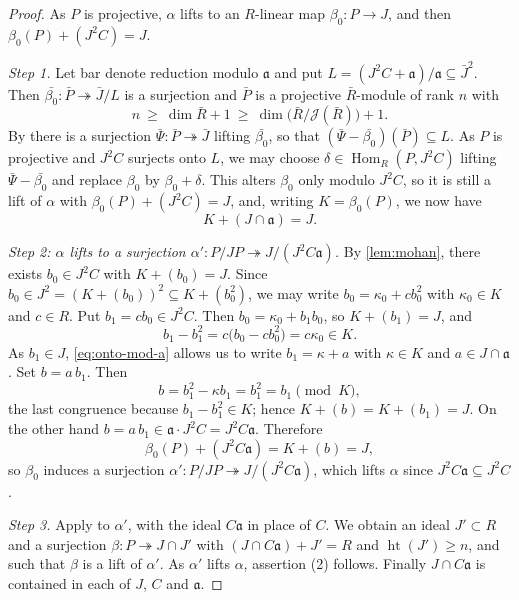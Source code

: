 \documentclass[11pt,reqno]{amsart}
\theoremstyle{plain}
\theoremstyle{definition}
\begin{document}
\begin{proof}
As $P$ is projective, $\alpha$ lifts to an $R$-linear map $\beta_{0}\colon P\to J$,
and then $\beta_{0}(P)+(J^{2}C)=J$.

\smallskip
\noindent\emph{Step 1.}
Let bar denote reduction modulo $\mathfrak{a}$ and put
$L=(J^{2}C+\mathfrak{a})/\mathfrak{a}\subseteq\bar{J}^{2}$. Then
$\bar{\beta_{0}}\colon\bar{P}\twoheadrightarrow\bar{J}/L$ is a surjection and
$\bar{P}$ is a projective $\bar{R}$-module of rank $n$ with
\[
  n\ \ge\ \dim\bar{R}+1\ \ge\ \dim\bigl(\bar{R}/\mathcal{J}(\bar{R})\bigr)+1 .
\]
By \cite[Lemma 4.4]{BK03} there is a surjection
$\bar{\Psi}\colon\bar{P}\twoheadrightarrow\bar{J}$ lifting $\bar{\beta_{0}}$, so
that $(\bar{\Psi}-\bar{\beta_{0}})(\bar{P})\subseteq L$. As $P$ is projective and
$J^{2}C$ surjects onto $L$, we may choose
$\delta\in\operatorname{Hom}_{R}(P,J^{2}C)$ lifting $\bar{\Psi}-\bar{\beta_{0}}$
and replace $\beta_{0}$ by $\beta_{0}+\delta$. This alters $\beta_{0}$ only
modulo $J^{2}C$, so it is still a lift of $\alpha$ with
$\beta_{0}(P)+(J^{2}C)=J$, and, writing $K=\beta_{0}(P)$, we now have
\begin{equation}\label{eq:onto-mod-a}
  K+(J\cap\mathfrak{a})=J .
\end{equation}

\smallskip
\noindent\emph{Step 2: $\alpha$ lifts to a surjection
$\alpha'\colon P/JP\twoheadrightarrow J/(J^{2}C\mathfrak{a})$.}
By \ref{lem:mohan}, there exists $b_{0}\in J^{2}C$ with $K+(b_{0})=J$. Since
$b_{0}\in J^{2}=(K+(b_{0}))^{2}\subseteq K+(b_{0}^{2})$, we may write
$b_{0}=\kappa_{0}+cb_{0}^{2}$ with $\kappa_{0}\in K$ and $c\in R$. Put
$b_{1}=cb_{0}\in J^{2}C$. Then $b_{0}=\kappa_{0}+b_{1}b_{0}$, so $K+(b_{1})=J$,
and
\[
  b_{1}-b_{1}^{2}=c\bigl(b_{0}-cb_{0}^{2}\bigr)=c\kappa_{0}\in K .
\]
As $b_{1}\in J$, \eqref{eq:onto-mod-a} allows us to write $b_{1}=\kappa+a$ with
$\kappa\in K$ and $a\in J\cap\mathfrak{a}$. Set $b=a\,b_{1}$. Then
\[
  b=b_{1}^{2}-\kappa b_{1}= b_{1}^{2}= b_{1} \pmod K ,
\]
the last congruence because $b_{1}-b_{1}^{2}\in K$; hence $K+(b)=K+(b_{1})=J$.
On the other hand $b=a\,b_{1}\in\mathfrak{a}\cdot J^{2}C=J^{2}C\mathfrak{a}$.
Therefore
\[
  \beta_{0}(P)+(J^{2}C\mathfrak{a})=K+(b)=J ,
\]
so $\beta_{0}$ induces a surjection
$\alpha'\colon P/JP\twoheadrightarrow J/(J^{2}C\mathfrak{a})$, which lifts
$\alpha$ since $J^{2}C\mathfrak{a}\subseteq J^{2}C$.

\smallskip
\noindent\emph{Step 3.}
Apply \cite[Lemma 2.6]{JZ} to $\alpha'$, with the ideal $C\mathfrak{a}$ in place
of $C$. We obtain an ideal $J'\subset R$ and a surjection
$\beta\colon P\twoheadrightarrow J\cap J'$ with $(J\cap C\mathfrak{a})+J'=R$ and
$\operatorname{ht}(J')\ge n$, and such that $\beta$ is a lift of $\alpha'$. As
$\alpha'$ lifts $\alpha$, assertion (2) follows. Finally
$J\cap C\mathfrak{a}$ is contained in each of $J$, $C$ and $\mathfrak{a}$.
\end{proof}
\end{document}
